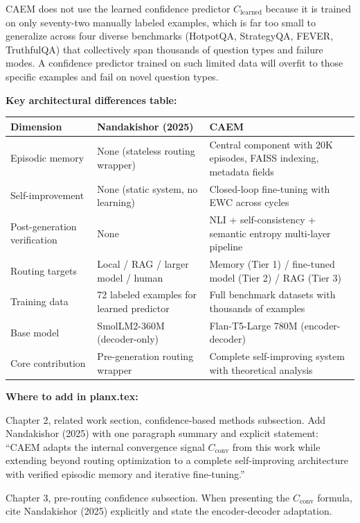 \documentclass[11pt,a4paper]{article}
\newcommand{\Cconv}{C_{\text{conv}}}
\begin{document}
{CAEM does not use the learned confidence predictor $C_{\text{learned}}$ because it is trained on only seventy-two manually labeled examples, which is far too small to generalize across four diverse benchmarks (HotpotQA, StrategyQA, FEVER, TruthfulQA) that collectively span thousands of question types and failure modes. A confidence predictor trained on such limited data will overfit to those specific examples and fail on novel question types.

\textbf{Key architectural differences table:}

\begin{center}
\small
\begin{tabular}{lp{5.5cm}p{5.5cm}}
\toprule
\textbf{Dimension} & \textbf{Nandakishor (2025)} & \textbf{CAEM} \\
\midrule
Episodic memory & None (stateless routing wrapper) & Central component with 20K episodes, FAISS indexing, metadata fields \\[4pt]
Self-improvement & None (static system, no learning) & Closed-loop fine-tuning with EWC across cycles \\[4pt]
Post-generation verification & None & NLI + self-consistency + semantic entropy multi-layer pipeline \\[4pt]
Routing targets & Local / RAG / larger model / human & Memory (Tier 1) / fine-tuned model (Tier 2) / RAG (Tier 3) \\[4pt]
Training data & 72 labeled examples for learned predictor & Full benchmark datasets with thousands of examples \\[4pt]
Base model & SmolLM2-360M (decoder-only) & Flan-T5-Large 780M (encoder-decoder) \\[4pt]
Core contribution & Pre-generation routing wrapper & Complete self-improving system with theoretical analysis \\
\bottomrule
\end{tabular}
\end{center}

\textbf{Where to add in planx.tex:}

Chapter 2, related work section, confidence-based methods subsection. Add Nandakishor (2025) with one paragraph summary and explicit statement: ``CAEM adapts the internal convergence signal $\Cconv$ from this work while extending beyond routing optimization to a complete self-improving architecture with verified episodic memory and iterative fine-tuning.''

Chapter 3, pre-routing confidence subsection. When presenting the $\Cconv$ formula, cite Nandakishor (2025) explicitly and state the encoder-decoder adaptation.

}
\end{document}
